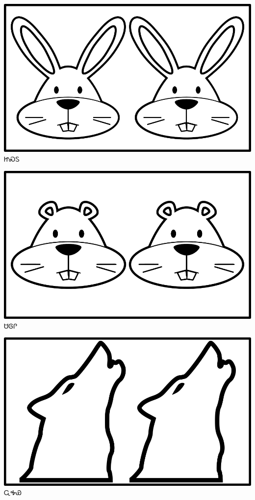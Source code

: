 \documentclass[avery5371]{flashcards}%
\begin{document}
\begin{flashcard}{
\includegraphics[width=0.95\columnwidth,height=.51\columnwidth,keepaspectratio]{../artwork/objects-animate/anitali-jisdu}
}\Huge ᏥᏍᏚ
\end{flashcard}

\begin{flashcard}{
\includegraphics[width=0.95\columnwidth,height=.51\columnwidth,keepaspectratio]{../artwork/objects-animate/anitali-saloli}
}\Huge ᏌᎶᎵ
\end{flashcard}

\begin{flashcard}{
\includegraphics[width=0.95\columnwidth,height=.51\columnwidth,keepaspectratio]{../artwork/objects-animate/anitali-wahya}
}\Huge ᏩᎭᏯ
\end{flashcard}
\end{document}
